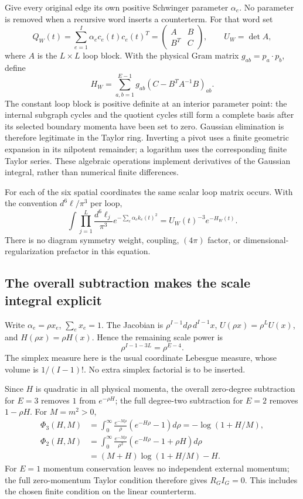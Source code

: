 Give every original edge its own positive Schwinger parameter $\alpha_e$.
No parameter is removed when a recursive word inserts a counterterm.
For that word set
\[
 Q_W(t)=\sum_{e=1}^I\alpha_e c_e(t)c_e(t)^T
       =\begin{pmatrix}A&B\\B^T&C\end{pmatrix},\qquad
 U_W=\det A,
\]
where $A$ is the $L\times L$ loop block.  With the physical Gram matrix
$g_{ab}=p_a\cdot p_b$, define
\[
 H_W=\sum_{a,b=1}^{E-1}g_{ab}
                  (C-B^TA^{-1}B)_{ab}.
\]
The constant loop block is positive definite at an interior parameter
point: the internal subgraph cycles and the quotient cycles still form
a complete basis after its selected boundary momenta have been set to
zero.  Gaussian elimination is therefore legitimate in the Taylor
ring.  Inverting a pivot uses a finite geometric expansion in its
nilpotent remainder; a logarithm uses the corresponding finite Taylor
series.  These algebraic operations implement derivatives of the
Gaussian integral, rather than numerical finite differences.

For each of the six spatial coordinates the same scalar loop matrix
occurs.  With the convention $d^6\ell/\pi^3$ per loop,
\[
 \int\prod_{j=1}^L\frac{d^6\ell_j}{\pi^3}
       e^{-\sum_e\alpha_e k_e(t)^2}
       =U_W(t)^{-3}e^{-H_W(t)}.
\]
There is no diagram symmetry weight, coupling, $(4\pi)$ factor, or
dimensional-regularization prefactor in this equation.

\subsection{The overall subtraction makes the scale integral explicit}

Write $\alpha_e=\rho x_e$, $\sum_e x_e=1$.  The Jacobian is
$\rho^{I-1}d\rho\,d^{I-1}x$, $U(\rho x)=\rho^LU(x)$, and
$H(\rho x)=\rho H(x)$.  Hence the remaining scale power is
\[
 \rho^{I-1-3L}=\rho^{E-4}.
\]
The simplex measure here is the usual coordinate Lebesgue measure,
whose volume is $1/(I-1)!$.  No extra simplex factorial is to be inserted.

Since $H$ is quadratic in all physical momenta, the overall zero-degree
subtraction for $E=3$ removes $1$ from $e^{-\rho H}$; the full
degree-two subtraction for $E=2$ removes $1-\rho H$.  For $M=m^2>0$,
\begin{align*}
 \Phi_3(H,M)
 &=\int_0^\infty\frac{e^{-M\rho}}\rho
                    (e^{-H\rho}-1)d\rho
 =-\log(1+H/M),\\
 \Phi_2(H,M)
 &=\int_0^\infty\frac{e^{-M\rho}}{\rho^2}
                    (e^{-H\rho}-1+\rho H)d\rho\\
 &=(M+H)\log(1+H/M)-H.
\end{align*}
For $E=1$ momentum conservation leaves no independent external momentum;
the full zero-momentum Taylor condition therefore gives $R_GI_G=0$.
This includes the chosen finite condition on the linear counterterm.

